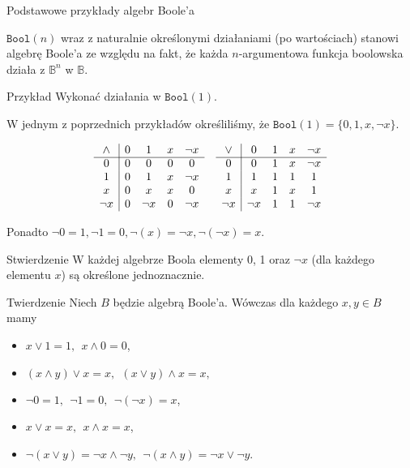 \documentclass[a4paper,10pt]{beamer}
\begin{document}
\begin{frame}{Podstawowe przykłady algebr Boole'a}
	
	\begin{block}{}
		$\mathtt{Bool}(n)$ wraz z naturalnie określonymi działaniami (po wartościach) stanowi algebrę Boole'a ze względu na fakt, że każda $n$-argumentowa funkcja boolowska działa z $\mathbb{B}^n$ w $\mathbb{B}$.
	\end{block}
	
	\begin{exampleblock}{Przykład}
		Wykonać działania w $\mathtt{Bool}(1)$.
		
		W jednym z poprzednich przykładów określiliśmy, że $\mathtt{Bool}(1)=\{0,1,x,\neg x\}$.
		
		$$\begin{array}{c|cccccc|cccc}
		\wedge&0&1&x&\neg x&       &\vee&0&1&x&\neg x\\\cline{1-5}\cline{7-11}
		0&0&0&0&0&                 &0&0&1&x&\neg x\\
		1&0&1&x&\neg x&            &1&1&1&1&1\\
		x&0&x&x&0&                 &x&x&1&x&1\\
		\neg x&0&\neg x&0&\neg x&  &\neg x&\neg x&1&1&\neg x
		\end{array}$$
		
		Ponadto $\neg 0=1, \neg1=0, \neg(x)=\neg x, \neg(\neg x)=x$.
		
	\end{exampleblock}	
	
\end{frame}



\begin{frame}
	
	\begin{block}{Stwierdzenie}
		W każdej algebrze Boola elementy 0, 1 oraz $\neg x$ (dla każdego elementu $x$) są określone jednoznacznie.
	\end{block}
	
	\begin{block}{Twierdzenie}
		Niech $B$ będzie algebrą Boole'a. Wówczas dla każdego $x,y\in B$ mamy
		\begin{itemize}
			\item $x\vee 1=1,\ \ x\wedge0=0$,
			\item $(x\wedge y)\vee x=x,\ \ (x\vee y)\wedge x=x,$
			\item $\neg0=1,\ \ \neg1=0,\ \ \neg(\neg x)=x$,
			\item $x\vee x=x,\ \ x\wedge x=x$,
			\item $\neg(x\vee y)=\neg x\wedge\neg y,\ \ \neg(x\wedge y)=\neg x\vee\neg y.$
		\end{itemize}
	\end{block}
	
\end{frame}
\end{document}
